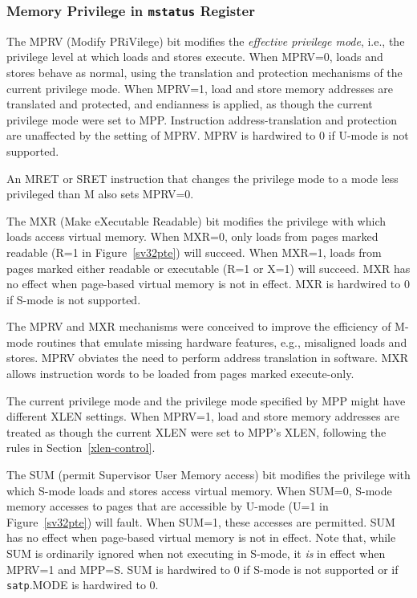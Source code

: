 \subsubsection{Memory Privilege in {\tt mstatus} Register}

The MPRV (Modify PRiVilege) bit modifies the {\em effective privilege mode},
i.e., the privilege level at which loads
and stores execute.  When MPRV=0, loads and stores
behave as normal, using the translation and protection mechanisms of the
current privilege mode.
When MPRV=1, load and store memory addresses are translated and protected, and
endianness is applied, as though the current privilege mode were set to MPP.
Instruction address-translation and protection are unaffected by the setting
of MPRV.  MPRV is hardwired to 0 if U-mode is not supported.

An MRET or SRET instruction that changes the privilege mode to a mode
less privileged than M also sets MPRV=0.

The MXR (Make eXecutable Readable) bit modifies the privilege with which loads
access virtual memory.  When MXR=0, only loads from pages marked readable (R=1
in Figure~\ref{sv32pte}) will succeed.  When MXR=1, loads from pages marked
either readable or executable (R=1 or X=1) will succeed.  MXR has no effect
when page-based virtual memory is not in effect.  MXR is hardwired to 0 if
S-mode is not supported.

\begin{commentary}
The MPRV and MXR mechanisms were conceived to improve the efficiency of M-mode
routines that emulate missing hardware features, e.g., misaligned loads and
stores.  MPRV obviates the need to perform address translation in software.
MXR allows instruction words to be loaded from pages marked execute-only.

The current privilege mode and the privilege mode specified by MPP might have
different XLEN settings.  When MPRV=1, load and store memory addresses are
treated as though the current XLEN were set to MPP's XLEN, following the rules
in Section~\ref{xlen-control}.
\end{commentary}

The SUM (permit Supervisor User Memory access) bit modifies the privilege with
which S-mode loads and stores access virtual memory.
When SUM=0, S-mode memory accesses to pages that are accessible by U-mode (U=1
in Figure~\ref{sv32pte}) will fault.  When SUM=1, these accesses are
permitted.  SUM has no effect when page-based virtual memory is not in effect.
Note that, while SUM is ordinarily ignored when not executing in S-mode, it
{\em is} in effect when MPRV=1 and MPP=S.  SUM is hardwired to 0 if S-mode is
not supported or if {\tt satp}.MODE is hardwired to 0.

